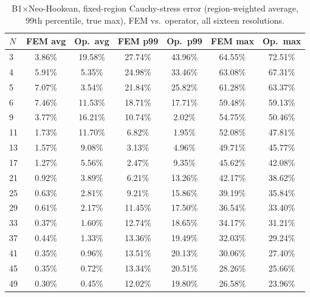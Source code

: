 \documentclass[11pt]{article}
\begin{document}
\begin{table}[h]
\centering
\caption{B1$\times$Neo-Hookean, fixed-region Cauchy-stress error
  (region-weighted average, 99th percentile, true max), FEM vs.\
  operator, all sixteen resolutions.}
\label{tab:s2-b1nh-b}
\scriptsize
\begin{tabular}{lcccccc}
\toprule
$N$ & FEM avg & Op.\ avg & FEM p99 & Op.\ p99 & FEM max & Op.\ max \\
\midrule
3  & 3.86\% & 19.58\% & 27.74\% & 43.96\% & 64.55\% & 72.51\% \\
4  & 5.91\% & 5.35\%  & 24.98\% & 33.46\% & 63.08\% & 67.31\% \\
5  & 7.07\% & 3.54\%  & 21.84\% & 25.82\% & 61.28\% & 63.37\% \\
6  & 7.46\% & 11.53\% & 18.71\% & 17.71\% & 59.48\% & 59.13\% \\
9  & 3.77\% & 16.21\% & 10.74\% & 2.02\%  & 54.75\% & 50.46\% \\
11 & 1.73\% & 11.70\% & 6.82\%  & 1.95\%  & 52.08\% & 47.81\% \\
13 & 1.57\% & 9.08\%  & 3.13\%  & 4.96\%  & 49.71\% & 45.77\% \\
17 & 1.27\% & 5.56\%  & 2.47\%  & 9.35\%  & 45.62\% & 42.08\% \\
21 & 0.92\% & 3.89\%  & 6.21\%  & 13.26\% & 42.17\% & 38.62\% \\
25 & 0.63\% & 2.81\%  & 9.21\%  & 15.86\% & 39.19\% & 35.84\% \\
29 & 0.61\% & 2.17\%  & 11.45\% & 17.50\% & 36.54\% & 33.40\% \\
33 & 0.37\% & 1.60\%  & 12.74\% & 18.65\% & 34.17\% & 31.21\% \\
37 & 0.44\% & 1.33\%  & 13.36\% & 19.49\% & 32.03\% & 29.24\% \\
41 & 0.35\% & 0.96\%  & 13.51\% & 20.13\% & 30.06\% & 27.40\% \\
45 & 0.35\% & 0.72\%  & 13.34\% & 20.51\% & 28.26\% & 25.66\% \\
49 & 0.30\% & 0.45\%  & 12.02\% & 19.80\% & 26.58\% & 23.96\% \\
\bottomrule
\end{tabular}
\end{table}
\end{document}
